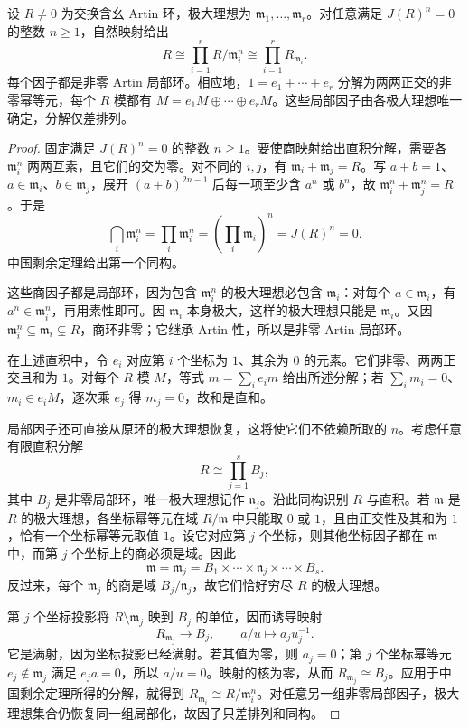 \begin{theorem}\label{b3:thm:artin-decomposition}
	设 \(R\ne0\) 为交换含幺 Artin 环，极大理想为 \(\mathfrak m_1,\ldots,\mathfrak m_r\)。对任意满足 \(J(R)^n=0\) 的整数 \(n\ge1\)，自然映射给出
	\[
		R\cong\prod_{i=1}^r R/\mathfrak m_i^n \cong\prod_{i=1}^r R_{\mathfrak m_i}.
	\]
	每个因子都是非零 Artin 局部环。相应地，\(1=e_1+\cdots+e_r\) 分解为两两正交的非零幂等元，每个 \(R\) 模都有 \(M=e_1M\oplus\cdots\oplus e_rM\)。这些局部因子由各极大理想唯一确定，分解仅差排列。
\end{theorem}
\begin{proof}
	固定满足 \(J(R)^n=0\) 的整数 \(n\ge1\)。要使商映射给出直积分解，需要各 \(\mathfrak m_i^n\) 两两互素，且它们的交为零。对不同的 \(i,j\)，有 \(\mathfrak m_i+\mathfrak m_j=R\)。写 \(a+b=1\)、\(a\in\mathfrak m_i\)、\(b\in\mathfrak m_j\)，展开 \((a+b)^{2n-1}\) 后每一项至少含 \(a^n\) 或 \(b^n\)，故 \(\mathfrak m_i^n+\mathfrak m_j^n=R\)。于是
	\[
		\bigcap_i\mathfrak m_i^n =\prod_i\mathfrak m_i^n =\left(\prod_i\mathfrak m_i\right)^n=J(R)^n=0.
	\]
	中国剩余定理给出第一个同构。

	这些商因子都是局部环，因为包含 \(\mathfrak m_i^n\) 的极大理想必包含 \(\mathfrak m_i\)：对每个 \(a\in\mathfrak m_i\)，有 \(a^n\in\mathfrak m_i^n\)，再用素性即可。因 \(\mathfrak m_i\) 本身极大，这样的极大理想只能是 \(\mathfrak m_i\)。又因 \(\mathfrak m_i^n\subseteq\mathfrak m_i\subsetneq R\)，商环非零；它继承 Artin 性，所以是非零 Artin 局部环。

	在上述直积中，令 \(e_i\) 对应第 \(i\) 个坐标为 \(1\)、其余为 \(0\) 的元素。它们非零、两两正交且和为 \(1\)。对每个 \(R\) 模 \(M\)，等式 \(m=\sum_i e_i m\) 给出所述分解；若 \(\sum_i m_i=0\)、\(m_i\in e_iM\)，逐次乘 \(e_j\) 得 \(m_j=0\)，故和是直和。

	局部因子还可直接从原环的极大理想恢复，这将使它们不依赖所取的 \(n\)。考虑任意有限直积分解
	\[
		R\cong\prod_{j=1}^s B_j,
	\]
	其中 \(B_j\) 是非零局部环，唯一极大理想记作 \(\mathfrak n_j\)。沿此同构识别 \(R\) 与直积。若 \(\mathfrak m\) 是 \(R\) 的极大理想，各坐标幂等元在域 \(R/\mathfrak m\) 中只能取 \(0\) 或 \(1\)，且由正交性及其和为 \(1\)，恰有一个坐标幂等元取值 \(1\)。设它对应第 \(j\) 个坐标，则其他坐标因子都在 \(\mathfrak m\) 中，而第 \(j\) 个坐标上的商必须是域。因此
	\[
		\mathfrak m=\mathfrak m_j =B_1\times\cdots\times\mathfrak n_j\times\cdots\times B_s.
	\]
	反过来，每个 \(\mathfrak m_j\) 的商是域 \(B_j/\mathfrak n_j\)，故它们恰好穷尽 \(R\) 的极大理想。

	第 \(j\) 个坐标投影将 \(R\setminus\mathfrak m_j\) 映到 \(B_j\) 的单位，因而诱导映射
	\[
		R_{\mathfrak m_j}\longrightarrow B_j, \qquad a/u\longmapsto a_j u_j^{-1}.
	\]
	它是满射，因为坐标投影已经满射。若其值为零，则 \(a_j=0\)；第 \(j\) 个坐标幂等元 \(e_j\notin\mathfrak m_j\) 满足 \(e_j a=0\)，所以 \(a/u=0\)。映射的核为零，从而 \(R_{\mathfrak m_j}\cong B_j\)。应用于中国剩余定理所得的分解，就得到 \(R_{\mathfrak m_i}\cong R/\mathfrak m_i^n\)。对任意另一组非零局部因子，极大理想集合仍恢复同一组局部化，故因子只差排列和同构。
\end{proof}

